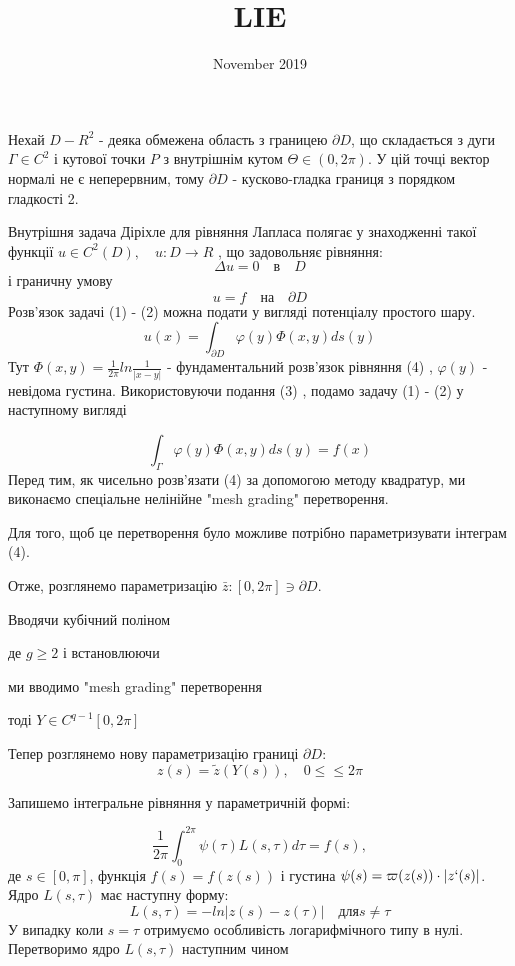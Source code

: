 \documentclass{article}
\title{LIE}
\author{}
\date{November 2019}
\begin{document}
Нехай  $D - R^2$  - деяка обмежена область з границею $\partial D$, що складається з дуги $\Gamma \in C^2$ і кутової точки $P$ з внутрішнім кутом $\Theta \in (0, 2\pi)$. У цій точці вектор нормалі не є неперервним, тому $\partial D$ - кусково-гладка границя з порядком гладкості 2. 

Внутрішня задача Діріхле для рівняння Лапласа полягає у знаходженні такої функції $u \in C^2(D), \quad u:D \rightarrow R$  , що задовольняє рівняння:
\begin{equation}
\Delta u = 0 \quad в \quad  D
\end{equation}
і граничну умову 
\begin{equation}
u=f \quad на \quad \partial D
\end{equation}
Розв'язок задачі (1) - (2) можна подати у вигляді потенціалу простого шару.
\begin{equation}
u(x) = \int_{\partial D} \varphi(y) \Phi(x,y) ds(y)
\end{equation}
Тут $\Phi(x,y) = \frac{1}{2\pi} ln\frac{1}{|x-y|}$ - фундаментальний розв'язок рівняння (4) , $\varphi(y)$ - невідома густина. Використовуючи подання (3) , подамо задачу (1) - (2) у наступному вигляді

	\begin{equation}
	\int_\Gamma \varphi(y) \Phi(x,y) ds(y) = f(x)
	\end{equation}
Перед тим, як чисельно розв'язати (4) за допомогою методу квадратур, ми виконаємо спеціальне нелінійне "mesh grading" перетворення.

Для того, щоб це перетворення було можливе потрібно параметризувати інтеграм (4). 

Отже, розглянемо параметризацію  $\bar{z} : [0,2\pi] \ni \partial D$. 

Вводячи кубічний поліном


де $g \geq 2$ і встановлюючи


ми вводимо "mesh grading" перетворення 


тоді  $Y \in C^{q-1}[0,2\pi]$

Тепер розглянемо нову параметризацію границі $\partial D$:
\begin{equation*}
z(s) = \tilde{z}(Y(s)), \quad 0\leq \leq 2\pi
\end{equation*}

Запишемо інтегральне рівняння у параметричній формі: 

\begin{equation}
\frac{1}{2\pi} \int_0^{2\pi} \psi(\tau) L(s,\tau)d\tau = f(s),
\end{equation}
де $s \in [0, \pi]$, функція $f(s) = f(z(s))$ і густина $\psi(s) = \varpi(z(s))  \cdot|z`(s)|$. Ядро $L(s,\tau)$  має наступну форму: 
\begin{equation*}
L(s,\tau) = -ln|z(s)- z(\tau)| \quad для s \neq \tau
\end{equation*}
У випадку коли $s=\tau$  отримуємо особливість логарифмічного типу в нулі. Перетворимо ядро $L(s,\tau)$ наступним чином 
\end{document}
